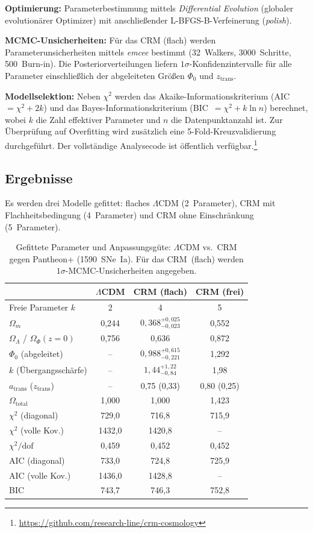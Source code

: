 \documentclass[aps,prd,twocolumn,superscriptaddress,nofootinbib]{revtex4-2}
\begin{document}
\textbf{Optimierung:} Parameterbestimmung mittels \textit{Differential Evolution} (globaler evolution\"arer Optimizer) mit anschlie\ss{}ender L-BFGS-B-Verfeinerung (\textit{polish}).

\textbf{MCMC-Unsicherheiten:} F\"ur das CRM (flach) werden Parameterunsicherheiten mittels \textit{emcee} \cite{ForemanMackey2013} bestimmt (32~Walkers, 3000~Schritte, 500~Burn-in). Die Posteriorverteilungen liefern $1\sigma$-Konfidenzintervalle f\"ur alle Parameter einschlie\ss{}lich der abgeleiteten Gr\"o\ss{}en $\Phi_0$ und $z_{\mathrm{trans}}$.

\textbf{Modellselektion:} Neben $\chi^2$ werden das Akaike-Informationskriterium (AIC~$= \chi^2 + 2k$) und das Bayes-Informationskriterium (BIC~$= \chi^2 + k \ln n$) berechnet, wobei $k$ die Zahl effektiver Parameter und $n$ die Datenpunktanzahl ist. Zur \"Uberpr\"ufung auf Overfitting wird zus\"atzlich eine 5-Fold-Kreuzvalidierung durchgef\"uhrt. Der vollst\"andige Analysecode ist \"offentlich verf\"ugbar.\footnote{\url{https://github.com/research-line/crm-cosmology}}

\subsection{Ergebnisse}
\label{subsec:ergebnisse}

Es werden drei Modelle gefittet: flaches $\Lambda$CDM (2~Parameter), CRM mit Flachheitsbedingung (4~Parameter) und CRM ohne Einschr\"ankung (5~Parameter).

\begin{table}[H]
\centering
\caption{Gefittete Parameter und Anpassungsg\"ute: $\Lambda$CDM vs.\ CRM gegen Pantheon+ (1590~SNe~Ia). F\"ur das CRM~(flach) werden $1\sigma$-MCMC-Unsicherheiten angegeben.}
\label{tab:results}
\begin{tabular}{lccc}
\toprule
 & $\Lambda$CDM & CRM (flach) & CRM (frei) \\
\midrule
Freie Parameter $k$ & 2 & 4 & 5 \\
$\Omega_m$ & 0,244 & $0{,}368^{+0{,}025}_{-0{,}023}$ & 0,552 \\
$\Omega_\Lambda$ / $\Omega_\Phi(z{=}0)$ & 0,756 & 0,636 & 0,872 \\
$\Phi_0$ (abgeleitet) & -- & $0{,}988^{+0{,}615}_{-0{,}221}$ & 1,292 \\
$k$ (\"Ubergangssch\"arfe) & -- & $1{,}44^{+1{,}22}_{-0{,}84}$ & 1,98 \\
$a_{\mathrm{trans}}$ ($z_{\mathrm{trans}}$) & -- & 0,75 (0,33) & 0,80 (0,25) \\
$\Omega_{\mathrm{total}}$ & 1,000 & 1,000 & 1,423 \\
\midrule
$\chi^2$ (diagonal) & 729,0 & 716,8 & 715,9 \\
$\chi^2$ (volle Kov.) & 1432,0 & 1420,8 & -- \\
$\chi^2/\mathrm{dof}$ & 0,459 & 0,452 & 0,452 \\
AIC (diagonal) & 733,0 & 724,8 & 725,9 \\
AIC (volle Kov.) & 1436,0 & 1428,8 & -- \\
BIC & 743,7 & 746,3 & 752,8 \\
\bottomrule
\end{tabular}
\end{table}
\end{document}
